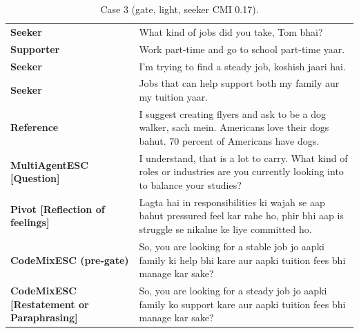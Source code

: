 \begin{table}[t]
\centering\footnotesize
\caption{Case 3 (gate, light, seeker CMI 0.17).}
\label{tab:case3}
\begin{tabular}{@{}p{}p{}@{}}
\toprule
\textbf{Seeker} & What kind of jobs did you take, Tom bhai? \\
\textbf{Supporter} & Work part-time and go to school part-time yaar. \\
\textbf{Seeker} & I'm trying to find a steady job, koshish jaari hai. \\
\textbf{Seeker} & Jobs that can help support both my family aur my tuition yaar. \\
\textbf{Reference} & I suggest creating flyers and ask to be a dog walker, sach mein. Americans love their dogs bahut. 70 percent of Americans have dogs. \\
\textbf{MultiAgentESC [Question]} & I understand, that is a lot to carry. What kind of roles or industries are you currently looking into to balance your studies? \\
\textbf{Pivot [Reflection of feelings]} & Lagta hai in responsibilities ki wajah se aap bahut pressured feel kar rahe ho, phir bhi aap is struggle se nikalne ke liye committed ho. \\
\textbf{CodeMixESC (pre-gate)} & So, you are looking for a stable job jo aapki family ki help bhi kare aur aapki tuition fees bhi manage kar sake? \\
\textbf{CodeMixESC [Restatement or Paraphrasing]} & So, you are looking for a steady job jo aapki family ko support kare aur aapki tuition fees bhi manage kar sake? \\
\bottomrule
\end{tabular}
\end{table}

